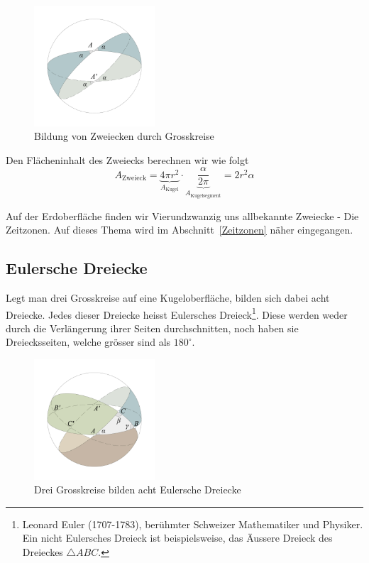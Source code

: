 \begin{refsection}
\begin{figure}[htbp]
\centering
\includegraphics[width=0.4\textwidth]{kugel/Zweieck.jpg}
\caption{Bildung von Zweiecken durch Grosskreise}
\end{figure}

Den Flächeninhalt des Zweiecks berechnen wir wie folgt
\begin{equation}
A_\text{Zweieck} = \underbrace{4 \pi r^{2}}_{\text{$A_\text{Kugel}$}} \cdot \underbrace{\frac{ \alpha }{ 2 \pi }}_{\text{$A_\text{Kugelsegment}$}} = 2 r^{2} \alpha 
\label {V5}
\end{equation}

Auf der Erdoberfläche finden wir Vierundzwanzig uns allbekannte Zweiecke - Die Zeitzonen. Auf dieses Thema wird im Abschnitt~\ref{Zeitzonen}  näher eingegangen.


\subsection{Eulersche Dreiecke} \label{Euler} 
Legt man drei Grosskreise auf eine Kugeloberfläche, bilden sich dabei acht Dreiecke. 
Jedes dieser Dreiecke heisst Eulersches Dreieck\footnote{%
Leonard Euler (1707-1783), berühmter Schweizer Mathematiker und Physiker. 
Ein nicht Eulersches Dreieck ist beispielsweise, das Äussere Dreieck des Dreieckes 
$\triangle{ABC}$.}.
Diese werden weder durch die Verlängerung ihrer Seiten durchschnitten, 
noch haben sie Dreiecksseiten, welche grösser sind als $180^{\circ}$.

\begin{figure}[htbp]
\centering
\includegraphics[width=0.4\textwidth]{kugel/EulerschesDreieck.jpg}
\caption{Drei Grosskreise bilden acht Eulersche Dreiecke}
\label{V10}
\end{figure}



\end{refsection}

